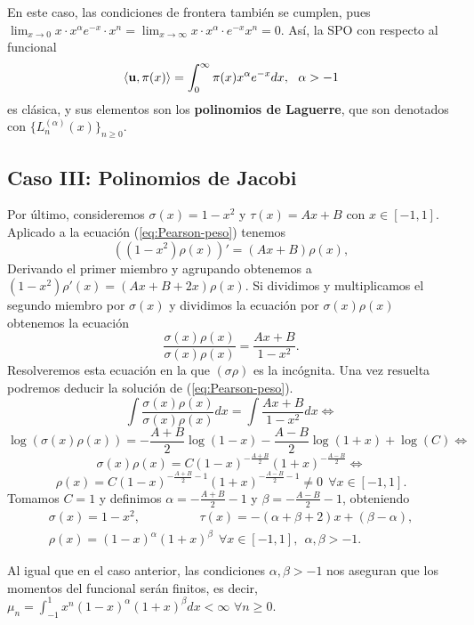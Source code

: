 En este caso, las condiciones de frontera también se cumplen, pues $\displaystyle\lim_{x\rightarrow 0} x\cdot x^{\alpha}e^{-x}\cdot x^n = \displaystyle\lim_{x\rightarrow \infty} x\cdot x^{\alpha}\cdot e^{-x} x^n = 0$. Así, la SPO con respecto al funcional
\begin{equation}
    \label{eq:func-laguerre}
    \prodesc{\uu}{\pi(x)} = \int_{0}^\infty \pi(x)x^{\alpha} e^{-x}dx, \ \ \alpha > -1
\end{equation}
es clásica, y sus elementos son los \textbf{polinomios de Laguerre}, que son denotados con $\{L_n^{(\alpha)}(x)\}_{n\geq 0}$.

\subsection{Caso III: Polinomios de Jacobi}

Por último, consideremos $\sigma(x) = 1-x^2$ y $\tau(x)=Ax+B$ con $x\in[-1,1]$. Aplicado a la ecuación (\ref{eq:Pearson-peso}) tenemos
$$
((1-x^2)\rho(x))'=(Ax+B)\rho(x),
$$
Derivando el primer miembro y agrupando obtenemos a $(1-x^2)\rho'(x)=(Ax+B+2x)\rho(x)$. Si dividimos y multiplicamos el segundo miembro por $\sigma(x)$ y dividimos la ecuación por $\sigma(x)\rho(x)$ obtenemos la ecuación
$$
\dfrac{\sigma(x)\rho(x)}{\sigma(x)\rho(x)} = \dfrac{Ax+B}{1-x^2}.
$$
Resolveremos esta ecuación en la que $(\sigma\rho)$ es la incógnita. Una vez resuelta podremos deducir la solución de (\ref{eq:Pearson-peso}).
$$
\int \dfrac{\sigma(x)\rho(x)}{\sigma(x)\rho(x)} dx = \int \dfrac{Ax+B}{1-x^2}dx\Leftrightarrow $$ $$\log(\sigma(x)\rho(x)) = -\dfrac{A+B}{2}\log(1-x)-\dfrac{A-B}{2}\log(1+x) + \log(C) \Leftrightarrow $$ $$
 \sigma(x)\rho(x) = C(1-x)^{-\frac{A+B}{2}}(1+x)^{-\frac{A-B}{2}}  \Leftrightarrow$$ $$\rho(x) = C(1-x)^{-\frac{A+B}{2}-1}(1+x)^{-\frac{A-B}{2}-1} \neq 0 \ \ \forall x\in[-1,1].
$$
Tomamos $C=1$ y definimos $\alpha = -\frac{A+B}{2}-1$ y $\beta=-\frac{A-B}{2}-1$, obteniendo
\begin{equation}
    \label{eq:parametros-jacobi}
    \begin{array}{c}
        \sigma(x)=1-x^2,\hspace{2cm} \tau(x)=-(\alpha+\beta+2)x+(\beta-\alpha), \\ 
        \rho(x) =(1-x)^{\alpha}(1+x)^{\beta}\ \ \forall x \in[-1,1], \ \ \alpha,\beta > -1.
    \end{array}
\end{equation}

Al igual que en el caso anterior, las condiciones $\alpha,\beta > -1$ nos aseguran que los momentos del funcional serán finitos, es decir, $\mu_n =\int_{-1}^1 x^n(1-x)^{\alpha}(1+x)^{\beta}dx <\infty$ $\forall n\geq 0$.

